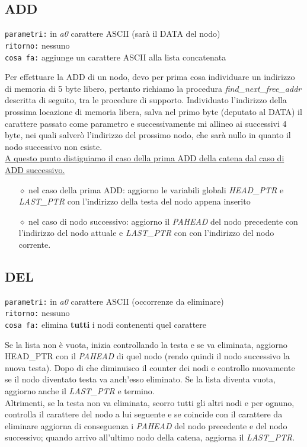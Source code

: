 \documentclass[11pt]{report}
\begin{document}
    \subsection{ADD}
    \begin{mdframed}
        \texttt{parametri:} in \textit{a0} carattere ASCII (sarà il DATA del nodo) \\
         \texttt{ritorno:} nessuno \\
         \texttt{cosa fa:} aggiunge un carattere ASCII alla lista concatenata
    \end{mdframed}
    Per effettuare la ADD di un nodo, devo per prima cosa individuare un indirizzo di memoria di 5 byte libero, pertanto richiamo la procedura \textit{find\_next\_free\_addr} descritta di seguito, tra le procedure di supporto. Individuato l'indirizzo della prossima locazione di memoria libera, salva nel primo byte (deputato al DATA) il carattere passato come parametro e successivamente mi allineo ai successivi 4 byte, nei quali salverò l'indirizzo del prossimo nodo, che sarà nullo in quanto il nodo successivo non esiste.\\
    \uline{A questo punto distiguiamo il caso della prima ADD della catena dal caso di ADD successivo.}
    \begin{itemize}
        \item[$\diamond$]nel caso della prima ADD: aggiorno le variabili globali \textit{HEAD\_PTR} e \textit{LAST\_PTR} con l'indirizzo della testa del nodo appena inserito
        \item [$\diamond$]nel caso di nodo successivo: aggiorno il \textit{PAHEAD} del nodo precedente con l'indirizzo del nodo attuale e \textit{LAST\_PTR} con con l'indirizzo del nodo corrente.
    \end{itemize}
    \newpage
    \subsection{DEL}
    \begin{mdframed}
        \texttt{parametri:} in \textit{a0} carattere ASCII (occorrenze da eliminare) \\
         \texttt{ritorno:} nessuno \\
         \texttt{cosa fa:} elimina \textbf{tutti} i nodi contenenti quel carattere
    \end{mdframed}
    Se la lista non è vuota, inizia controllando la testa e se va eliminata, aggiorno HEAD\_PTR con il \textit{PAHEAD} di quel nodo (rendo quindi il nodo successivo la nuova testa). Dopo di che diminuisco il counter dei nodi e controllo nuovamente se il nodo diventato testa va anch'esso eliminato. Se la lista diventa vuota, aggiorno anche il \textit{LAST\_PTR} e termino.\\
    Altrimenti, se la testa non va eliminata, scorro tutti gli altri nodi e per ognuno, controlla il carattere del nodo a lui seguente e se coincide con il carattere da eliminare aggiorna di conseguenza i \textit{PAHEAD} del nodo precedente e del nodo successivo; quando arrivo all'ultimo nodo della catena, aggiorna il \textit{LAST\_PTR}.
    
\end{document}
